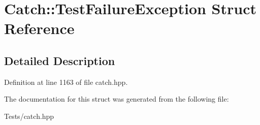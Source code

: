 \hypertarget{struct_catch_1_1_test_failure_exception}{}\section{Catch\+:\+:Test\+Failure\+Exception Struct Reference}
\label{struct_catch_1_1_test_failure_exception}


\subsection{Detailed Description}


Definition at line 1163 of file catch.\+hpp.



The documentation for this struct was generated from the following file\+:\begin{DoxyCompactItemize}
\item 
Tests/catch.\+hpp\end{DoxyCompactItemize}

